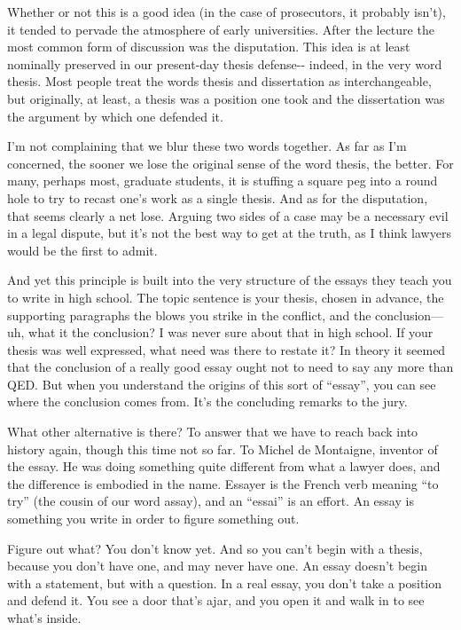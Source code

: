 Whether or not this is a good idea (in the case of prosecutors, it
probably isn't), it tended to pervade the atmosphere of early
universities. After the lecture the most common form of discussion was
the disputation. This idea is at least nominally preserved in our
present-day thesis defense-\/- indeed, in the very word thesis. Most
people treat the words thesis and dissertation as interchangeable, but
originally, at least, a thesis was a position one took and the
dissertation was the argument by which one defended it.

I'm not complaining that we blur these two words together. As far as I'm
concerned, the sooner we lose the original sense of the word thesis, the
better. For many, perhaps most, graduate students, it is stuffing a
square peg into a round hole to try to recast one's work as a single
thesis. And as for the disputation, that seems clearly a net lose.
Arguing two sides of a case may be a necessary evil in a legal dispute,
but it's not the best way to get at the truth, as I think lawyers would
be the first to admit.

And yet this principle is built into the very structure of the essays
they teach you to write in high school. The topic sentence is your
thesis, chosen in advance, the supporting paragraphs the blows you
strike in the conflict, and the conclusion--- uh, what it the
conclusion? I was never sure about that in high school. If your thesis
was well expressed, what need was there to restate it? In theory it
seemed that the conclusion of a really good essay ought not to need to
say any more than QED. But when you understand the origins of this sort
of ``essay'', you can see where the conclusion comes from. It's the
concluding remarks to the jury.

What other alternative is there? To answer that we have to reach back
into history again, though this time not so far. To Michel de Montaigne,
inventor of the essay. He was doing something quite different from what
a lawyer does, and the difference is embodied in the name. Essayer is
the French verb meaning ``to try'' (the cousin of our word assay), and
an ``essai'' is an effort. An essay is something you write in order to
figure something out.

Figure out what? You don't know yet. And so you can't begin with a
thesis, because you don't have one, and may never have one. An essay
doesn't begin with a statement, but with a question. In a real essay,
you don't take a position and defend it. You see a door that's ajar, and
you open it and walk in to see what's inside.

